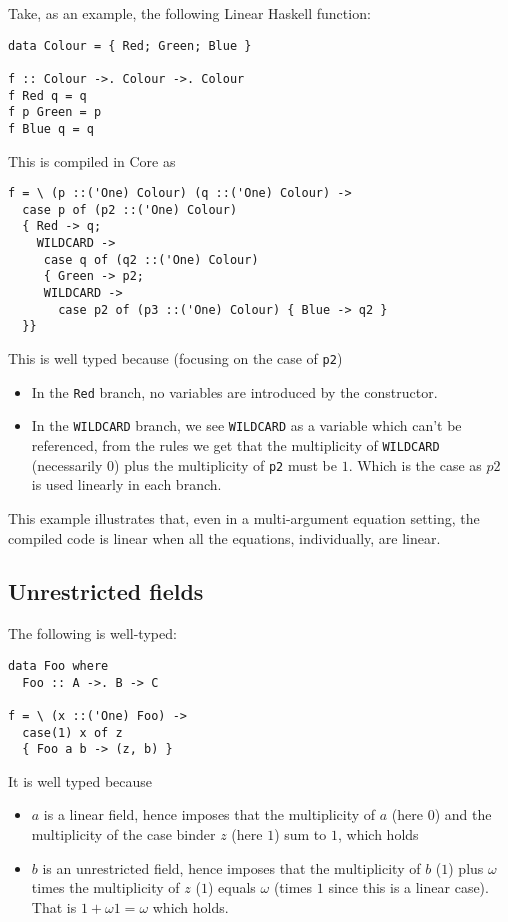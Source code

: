 \documentclass{article}
\begin{document}
Take, as an example, the following Linear Haskell function:
\begin{verbatim}
data Colour = { Red; Green; Blue }

f :: Colour ->. Colour ->. Colour
f Red q = q
f p Green = p
f Blue q = q
\end{verbatim}
This is compiled in Core as
\begin{verbatim}
f = \ (p ::('One) Colour) (q ::('One) Colour) ->
  case p of (p2 ::('One) Colour)
  { Red -> q;
    WILDCARD ->
     case q of (q2 ::('One) Colour)
     { Green -> p2;
     WILDCARD ->
       case p2 of (p3 ::('One) Colour) { Blue -> q2 }
  }}
\end{verbatim}
This is well typed because (focusing on the case of \verb+p2+)
\begin{itemize}
\item In the \verb+Red+ branch, no variables are introduced by the
  constructor.
\item In the \verb+WILDCARD+ branch, we see \verb+WILDCARD+ as a
  variable which can't be referenced, from the rules we get that the
  multiplicity of \verb+WILDCARD+ (necessarily $0$) plus the
  multiplicity of \verb+p2+ must be $1$. Which is the case as $p2$ is
  used linearly in each branch.
\end{itemize}

This example illustrates that, even in a multi-argument equation
setting, the compiled code is linear when all the equations,
individually, are linear.

\subsection{Unrestricted fields}

The following is well-typed:
\begin{verbatim}
data Foo where
  Foo :: A ->. B -> C

f = \ (x ::('One) Foo) ->
  case(1) x of z
  { Foo a b -> (z, b) }
\end{verbatim}
It is well typed because
\begin{itemize}
\item $a$ is a linear field, hence imposes that the multiplicity of
  $a$ (here $0$) and the multiplicity of the case binder $z$
  (here $1$) sum to $1$, which holds
\item $b$ is an unrestricted field, hence imposes that the
  multiplicity of $b$ ($1$) plus $ω$ times the multiplicity of $z$
  ($1$) equals $ω$ (times $1$ since this is a linear case). That is
  $1+ω1=ω$ which holds.
\end{itemize}
\end{document}

